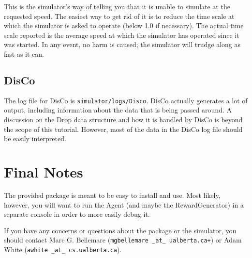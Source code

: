\documentclass[12pt]{article}
\begin{document}
This is the simulator's way of telling you that it is unable to simulate
at the requested speed. The easiest way to get rid of it is to reduce the
time scale at which the simulator is asked to operate (below 1.0 if necessary).
The actual time scale reported is the average speed at which the simulator
has operated since it was started. In any event, no harm is caused; the 
simulator will trudge along as fast as it can.

\subsection{DisCo}

The log file for DisCo is \verb+simulator/logs/Disco+. DisCo actually generates 
a lot of output, including information about the data
that is being passed around. A discussion on the Drop data structure and how 
it is handled by DisCo is beyond the scope of this tutorial. However, most of 
the data in the DisCo log file should be easily interpreted.

\section{Final Notes}

The provided package is meant to be easy to install and use. Most likely,
however, you will want to run the Agent (and maybe the RewardGenerator) in
a separate console in order to more easily debug it.

If you have any concerns or questions about the package or the simulator,
you should contact Marc G. Bellemare (\texttt{mgbellemare \_at\_ ualberta.ca+}) or Adam White (\texttt{awhite \_at\_ cs.ualberta.ca}).
\end{document}
